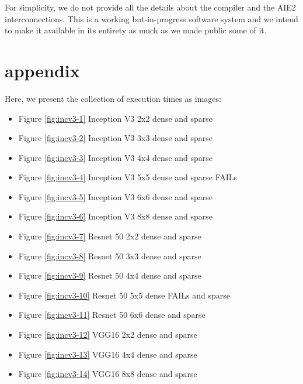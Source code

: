 \documentclass[conference]{IEEEtran}
\begin{document}
For simplicity, we do not provide all the details about the
compiler and the AIE2 interconnections. This is a working
but-in-progress software system and we intend to make it available in
its entirety as much as we made public some of it.
     
     
\section{appendix}
\label{sec:appendix}



Here, we
present the collection of execution times as images:
\begin{itemize}
  \item Figure \ref{fig:incv3-1} Inception V3 2x2 dense and sparse
  \item Figure \ref{fig:incv3-2} Inception V3 3x3 dense and sparse
  \item Figure \ref{fig:incv3-3} Inception V3 4x4 dense and sparse
  \item Figure \ref{fig:incv3-4} Inception V3 5x5 dense and sparse FAILs
  \item Figure \ref{fig:incv3-5} Inception V3 6x6 dense and sparse 
  \item Figure \ref{fig:incv3-6} Inception V3 8x8 dense and sparse
  \item Figure \ref{fig:incv3-7} Resnet 50 2x2 dense and sparse   
  \item Figure \ref{fig:incv3-8} Resnet 50 3x3 dense and sparse   
  \item Figure \ref{fig:incv3-9} Resnet 50 4x4 dense and sparse   
  \item Figure \ref{fig:incv3-10} Resnet 50 5x5 dense FAILs and sparse   
  \item Figure \ref{fig:incv3-11} Resnet 50 6x6 dense and sparse   
  \item Figure \ref{fig:incv3-12} VGG16  2x2 dense and sparse   
  \item Figure \ref{fig:incv3-13} VGG16  4x4 dense and sparse   
  \item Figure \ref{fig:incv3-14} VGG16  8x8 dense and sparse   
\end{itemize}
\newpage 
{}
\end{document}
